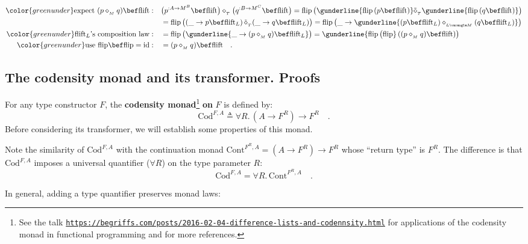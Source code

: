 \begin{align*}
{\color{greenunder}\text{expect }(p\diamond_{_{M}}q)\bef\text{flift}:}\quad & \big(p^{:A\rightarrow M^{B}}\bef\text{flift}\big)\diamond_{_{T}}\big(q^{:B\rightarrow M^{C}}\bef\text{flift}\big)=\text{flip}\,\big(\gunderline{\text{flip}\,(p\bef\text{flift})}\tilde{\diamond}_{_{T}}\gunderline{\text{flip}\,(q\bef\text{flift})}\big)\\
 & =\text{flip}\,\big((\_\rightarrow p\bef\text{flift}_{L})\,\tilde{\diamond}_{_{T}}(\_\rightarrow q\bef\text{flift}_{L})\big)=\text{flip}\,\big(\_\rightarrow\gunderline{(p\bef\text{flift}_{L})\diamond_{_{L\varangle M}}(q\bef\text{flift}_{L})}\big)\\
{\color{greenunder}\text{flift}_{L}\text{\textsf{'}s composition law}:}\quad & =\text{flip}\,\big(\gunderline{\_\rightarrow(p\diamond_{_{M}}q)\bef\text{flift}_{L}}\big)=\gunderline{\text{flip}\,\big(\text{flip}}\,((p\diamond_{_{M}}q)\bef\text{flift})\big)\\
{\color{greenunder}\text{use }\text{flip}\bef\text{flip}=\text{id}:}\quad & =(p\diamond_{_{M}}q)\bef\text{flift}\quad.
\end{align*}


\subsection{The codensity monad and its transformer. Proofs\label{subsec:The-codensity-monad}}

For any type constructor $F$, the \textbf{codensity
monad}\footnote{See the talk \texttt{\href{https://begriffs.com/posts/2016-02-04-difference-lists-and-codennsity.html}{https://begriffs.com/posts/2016-02-04-difference-lists-and-codennsity.html}}
for applications of the codensity monad in functional programming
and for more references.} \textbf{on} $F$ is defined by:
\[
\text{Cod}^{F,A}\triangleq\forall R.\,(A\rightarrow F^{R})\rightarrow F^{R}\quad.
\]
Before considering its transformer, we will establish some properties
of this monad.

Note the similarity of $\text{Cod}^{F,A}$ with the continuation monad
$\text{Cont}^{F^{R},A}=(A\rightarrow F^{R})\rightarrow F^{R}$ whose
\textsf{``}return type\textsf{''} is $F^{R}$. The difference is that $\text{Cod}^{F,A}$
imposes a universal quantifier ($\forall R$) on the type parameter
$R$:
\[
\text{Cod}^{F,A}=\forall R.\,\text{Cont}^{F^{R},A}\quad.
\]

In general, adding a type quantifier preserves monad laws:


